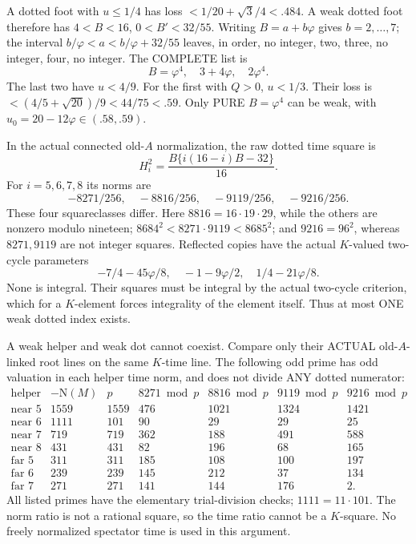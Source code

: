 \documentclass[11pt]{article}
\begin{document}
A dotted foot with \(u\le1/4\) has loss
\(<1/20+\sqrt3/4<.484\).
A weak dotted foot therefore has
\(4<B<16\), \(0<B'<32/55\).
Writing \(B=a+b\varphi\) gives \(b=2,\ldots,7\);
the interval
\(b/\varphi<a<b/\varphi+32/55\)
leaves, in order, no integer, two, three,
no integer, four, no integer.
The COMPLETE list is
\[
                        B=\varphi^4,\quad3+4\varphi,\quad2\varphi^4 .
\]
The last two have \(u<4/9\).
For the first with \(Q>0\), \(u<1/3\).
Their loss is \(<(4/5+\sqrt{20})/9<44/75<.59\).
Only PURE \(B=\varphi^4\) can be weak,
with \(u_0=20-12\varphi\in(.58,.59)\).

In the actual connected old-\(A\) normalization,
the raw dotted time square is
\[
                  H_i^2={\frac{B\{i(16-i)B-32\}}{16}}.
\]
For \(i=5,6,7,8\) its norms are
\[
                 -8271/256,\quad-8816/256,\quad-9119/256,\quad-9216/256 .
\]
These four squareclasses differ.
Here \(8816=16\cdot19\cdot29\), while the
others are nonzero modulo nineteen;
\(8684^2<8271\cdot9119<8685^2\);
and \(9216=96^2\), whereas \(8271,9119\)
are not integer squares.
Reflected copies have the actual
\(K\)-valued two-cycle parameters
\[
             -7/4-45\varphi/8,\quad-1-9\varphi/2,\quad
                                       1/4-21\varphi/8 .
\]
None is integral.
Their squares must be integral by the
actual two-cycle criterion, which for
a \(K\)-element forces integrality of the
element itself.
Thus at most ONE weak dotted index exists.

A weak helper and weak dot cannot coexist.
Compare only their ACTUAL old-\(A\)-linked
root lines on the same \(K\)-time line.
The following odd prime has odd valuation
in each helper time norm, and does not
divide ANY dotted numerator:
\[
 \begin{array}{c|r|r|rrrr}
 \text{helper}&-\mathrm N(M)&p&
           8271\bmod p&8816\bmod p&9119\bmod p&9216\bmod p\\ \hline
 \text{near }5&1559&1559&476&1021&1324&1421\\
 \text{near }6&1111&101&90&29&29&25\\
 \text{near }7&719&719&362&188&491&588\\
 \text{near }8&431&431&82&196&68&165\\
 \text{far }5&311&311&185&108&100&197\\
 \text{far }6&239&239&145&212&37&134\\
 \text{far }7&271&271&141&144&176&2 .
 \end{array}
\]
All listed primes have the elementary
trial-division checks; \(1111=11\cdot101\).
The norm ratio is not a rational square,
so the time ratio cannot be a \(K\)-square.
No freely normalized spectator time is
used in this argument.
\end{document}
